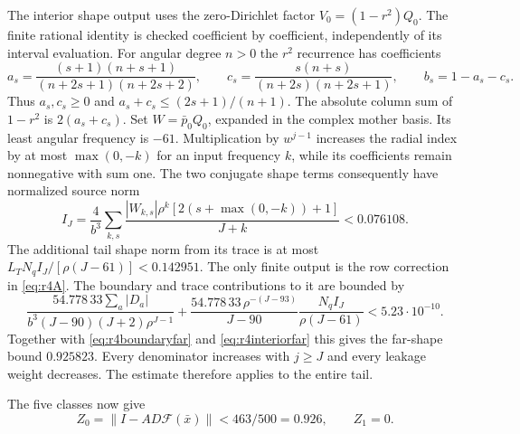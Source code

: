 \documentclass[11pt]{amsart}
\theoremstyle{remark}
\numberwithin{equation}{section}
\newcommand{\F}{\mathcal F}
\newcommand{\norm}[1]{\lVert#1\rVert}
\begin{document}
The interior shape output uses the zero-Dirichlet factor
$V_0=(1-r^2)Q_0$. The finite rational identity is checked coefficient by
coefficient, independently of its interval evaluation.
For angular degree $n>0$ the $r^2$ recurrence has coefficients
\[
 a_s=\frac{(s+1)(n+s+1)}{(n+2s+1)(n+2s+2)},\qquad
 c_s=\frac{s(n+s)}{(n+2s)(n+2s+1)},\qquad b_s=1-a_s-c_s.
\]
Thus $a_s,c_s\ge0$ and
$a_s+c_s\le(2s+1)/(n+1)$. The absolute column sum of $1-r^2$ is
$2(a_s+c_s)$.
Set $W=\bar p_0Q_0$, expanded in the complex mother basis.
Its least angular frequency is $-61$. Multiplication by $w^{j-1}$
increases the radial index by at most $\max(0,-k)$ for an input
frequency $k$, while its coefficients remain nonnegative with sum one.
The two conjugate shape terms consequently have normalized source norm
\begin{equation}\label{eq:r4interiorfar}
 I_J=\frac4{b^3}\sum_{k,s}
       \frac{|W_{k,s}|\rho^k[2(s+\max(0,-k))+1]}{J+k}
       <0.076108.
\end{equation}
The additional tail shape norm from its trace is at most
$L_TN_q I_J/[\rho(J-61)]<0.142951$.
The only finite output is the row correction in \eqref{eq:r4A}.
The boundary and trace contributions to it are bounded by
\[
 \frac{54.778\,33\sum_a|D_a|}
 {b^3(J-90)(J+2)\rho^{J-1}}
 +\frac{54.778\,33\,\rho^{-(J-93)}}{J-90}
                  \frac{N_q I_J}{\rho(J-61)}
 <5.23\cdot10^{-10}.
\]
Together with \eqref{eq:r4boundaryfar} and \eqref{eq:r4interiorfar}
this gives the far-shape bound $0.925823$. Every denominator increases
with $j\ge J$ and every leakage weight decreases. The estimate therefore
applies to the entire tail.

The five classes now give
\begin{equation}\label{eq:r4Z}
 Z_0=\norm{I-AD\F(\bar x)}<463/500=0.926,\qquad Z_1=0.
\end{equation}
\end{document}

